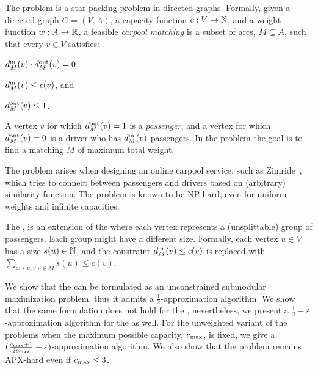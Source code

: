 The \carpool problem is a star packing problem in directed graphs.
Formally, given a directed graph $G = (V, A)$, a capacity function $c:
V \rightarrow \N$, and a weight function $w : A \rightarrow \R $, a
feasible \emph{carpool matching} is a subset of arcs, $M \subseteq A$,
such that every $v \in V$ satisfies:
\begin{inparaenum}[(i)]
\item $\din[M](v) \cdot \dout[M](v) = 0$,
\item $\din[M](v) \leq c(v)$, and 
\item $\dout[M](v) \leq 1$.
\end{inparaenum}
A vertex $v$ for which $\dout[M](v) = 1$ is a \emph{passenger}, and a
vertex for which $\dout[M](v) = 0$ is a driver who has $\din[M](v)$
passengers.  In the \carpool problem the goal is to find a matching
$M$ of maximum total weight.

The problem arises when designing an online carpool service, such as
Zimride~\cite{zimride}, which tries to connect between passengers and
drivers based on (arbitrary) similarity function.  The problem is
known to be NP-hard, even for uniform weights and infinite capacities.

The \gcp, is an extension of the \carpool where each vertex represents a
(unsplittable) group of passengers.
Each group might have a different size.  
Formally, each vertex $u \in V$ has a size $s(u) \in \N$,
and the constraint $\din(v) \leq c(v)$ is replaced with
$\sum_{u:(u,v) \in M} s(u) \leq c(v)$.  

We show that the \carpool can be formulated as an unconstrained
submodular maximization problem, thus it admits a
$\frac{1}{2}$-approximation algorithm.
We show that the same formulation does not hold for the \gcp,
nevertheless, we present a $\frac{1}{2} - \varepsilon$-approximation algorithm
for the \gcp as well.
For the unweighted variant of
the problems when the maximum possible capacity, $\cmax$, is fixed, we give
a $(\frac{\cmax + 1}{2\cmax} - \varepsilon)$-approximation algorithm.
We also show that the problem remains APX-hard even if $\cmax \leq 3$.
